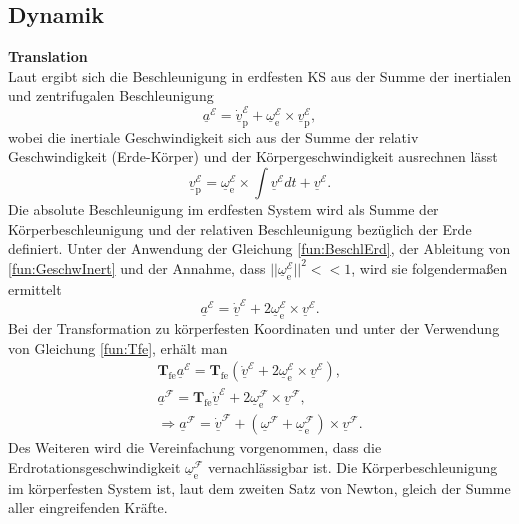 \subsection{Dynamik}
\textbf{Translation}\\
Laut \cite{FlugmechanikBuch} ergibt sich die Beschleunigung in erdfesten KS  aus der Summe der inertialen und zentrifugalen Beschleunigung
\begin{equation}
\label{fun:BeschlErd}
\underline{a}^\mathcal{E} = \underline{\dot{v}}^\mathcal{E}_\mathrm{p} + \underline{\omega}^\mathcal{E}_\mathrm{e}\times \underline{v}^\mathcal{E}_\mathrm{p},
\end{equation}
wobei die inertiale Geschwindigkeit sich aus der Summe der relativ Geschwindigkeit (Erde-Körper) und der Körpergeschwindigkeit ausrechnen lässt
\begin{equation}
\label{fun:GeschwInert}
\underline{v}^\mathcal{E}_\mathrm{p} = \underline{\omega}^\mathcal{E}_\mathrm{e}\times \int \underline{v}^\mathcal{E} dt + \underline{v}^\mathcal{E}.
\end{equation}
Die absolute Beschleunigung im erdfesten System wird als Summe der Körperbeschleunigung  und der relativen Beschleunigung bezüglich der Erde definiert. Unter der Anwendung der Gleichung \eqref{fun:BeschlErd}, der Ableitung von \eqref{fun:GeschwInert} und der Annahme, dass $||\underline{\omega}_\mathrm{e}^\mathcal{E}||^2 <<1$, wird sie folgendermaßen ermittelt 
\begin{equation}
\label{fun:a}
\underline{a}^\mathcal{E} = \underline{\dot{v}}^\mathcal{E} + 2\underline{\omega}_\mathrm{e}^\mathcal{E} \times \underline{v}^\mathcal{E}.
\end{equation}
Bei der Transformation zu körperfesten Koordinaten und unter der Verwendung von Gleichung \eqref{fun:Tfe}, erhält man
\begin{align}
\textbf{T}_\mathrm{fe}\underline{a}^\mathcal{E} = \textbf{T}_\mathrm{fe}(\underline{\dot{v}}^\mathcal{E} + 2\underline{\omega}_\mathrm{e}^\mathcal{E} \times \underline{v}^\mathcal{E}),\\
\underline{a}^\mathcal{F} = \textbf{T}_\mathrm{fe}\underline{\dot{v}}^\mathcal{E} +  2\underline{\omega}_\mathrm{e}^\mathcal{F} \times \underline{v}^\mathcal{F},\\
\label{fun:a}
\Rightarrow \underline{a}^\mathcal{F} = \underline{\dot{v}}^\mathcal{F} + (\underline{\omega}^\mathcal{F}+\underline{\omega}_\mathrm{e}^\mathcal{F})\times \underline{v}^\mathcal{F}.
\end{align}
Des Weiteren wird die Vereinfachung vorgenommen, dass die Erdrotationsgeschwindigkeit $\underline{\omega}_\mathrm{e}^\mathcal{F}$ vernachlässigbar ist. Die Körperbeschleunigung im körperfesten System ist, laut dem zweiten Satz von Newton, gleich der Summe aller eingreifenden Kräfte. 
